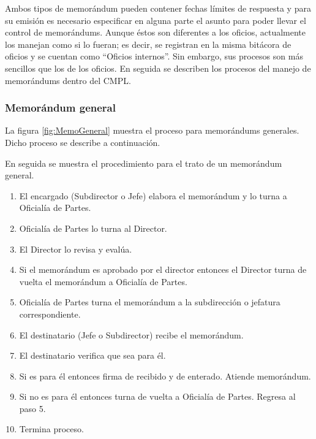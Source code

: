 	Ambos tipos de memorándum pueden contener fechas límites de respuesta y para su emisión es necesario especificar en alguna parte el asunto para poder llevar el control de memorándums. Aunque éstos son diferentes a los oficios, actualmente los manejan como si lo fueran; es decir, se registran en la misma bitácora de oficios y se cuentan como ``Oficios internos''. Sin embargo, sus procesos son más sencillos que los de los oficios. En seguida se describen los procesos del manejo de memorándums dentro del CMPL. 

	\subsubsection{Memorándum general}
	La figura \ref{fig:MemoGeneral} muestra el proceso para memorándums generales. Dicho proceso se describe a continuación.
	
	En seguida se muestra el procedimiento para el trato de un memorándum general.
	
	\begin{enumerate}
		\item El encargado (Subdirector o Jefe) elabora el memorándum y lo turna a Oficialía de Partes.
		\item Oficialía de Partes lo turna al Director.
		\item El Director lo revisa y evalúa.
		\item Si el memorándum es aprobado por el director entonces el Director turna de vuelta el memorándum a Oficialía de Partes.
		\item Oficialía de Partes turna el memorándum a la subdirección o jefatura correspondiente.
		\item El destinatario (Jefe o Subdirector) recibe el memorándum.
		\item El destinatario verifica que sea para él.
		\item Si es para él entonces firma de recibido y de enterado. Atiende memorándum.
		\item Si no es para él entonces turna de vuelta a Oficialía de Partes. Regresa al paso 5.
		\item Termina proceso.
	\end{enumerate}
	
	
